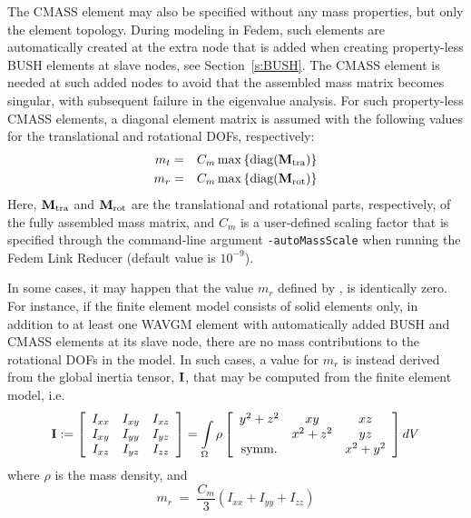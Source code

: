 The CMASS element may also be specified without any mass properties,
but only the element topology.
During modeling in Fedem, such elements are automatically created at the extra
node that is added when creating property-less BUSH elements at slave nodes,
see Section~\ref{s:BUSH}.
The CMASS element is needed at such added nodes to avoid that the assembled mass
matrix becomes singular, with subsequent failure in the eigenvalue analysis.
For such property-less CMASS elements, a diagonal element matrix is assumed with
the following values for the translational and rotational DOFs, respectively:
%
\begin{eqnarray}
\label{eq:max translational mass}
m_t &=& C_m \max\left\{{\rm diag}({\bf M}_{\rm tra})\right\} \\
\label{eq:max rotational mass}
m_r &=& C_m \max\left\{{\rm diag}({\bf M}_{\rm rot})\right\}
\end{eqnarray}
%
Here, ${\bf M}_{\rm tra}$ and ${\bf M}_{\rm rot}$ are the translational and
rotational parts, respectively, of the fully assembled mass matrix,
and $C_m$ is a user-defined scaling factor that is specified through the
command-line argument {\tt -autoMassScale} when running the Fedem Link Reducer
(default value is $10^{-9}$).

In some cases, it may happen that the value $m_r$ defined by
, is identically zero.
For instance, if the finite element model consists of solid elements only,
in addition to at least one WAVGM element with automatically added BUSH and
CMASS elements at its slave node, there are no mass contributions to the
rotational DOFs in the model.
In such cases, a value for $m_r$ is instead derived from the global inertia
tensor, ${\bf I}$, that may be computed from the finite element model, i.e.
%
\begin{equation}
{\bf I} := \left[\begin{array}{ccc}
I_{xx} & I_{xy} & I_{xz} \\
I_{xy} & I_{yy} & I_{yz} \\
I_{xz} & I_{yz} & I_{zz} \\
\end{array}\right] = \int\limits_\Omega \rho \left[\begin{array}{ccc}
y^2 + z^2    & xy        & xz \\
             & x^2 + z^2 & yz \\
\mbox{symm.} &           & x^2 + y^2
\end{array}\right] dV
\end{equation}
%
where $\rho$ is the mass density, and
%
\begin{equation}
m_r \;=\; \frac{C_m}{3} \left( I_{xx} + I_{yy} + I_{zz} \right)
\end{equation}
